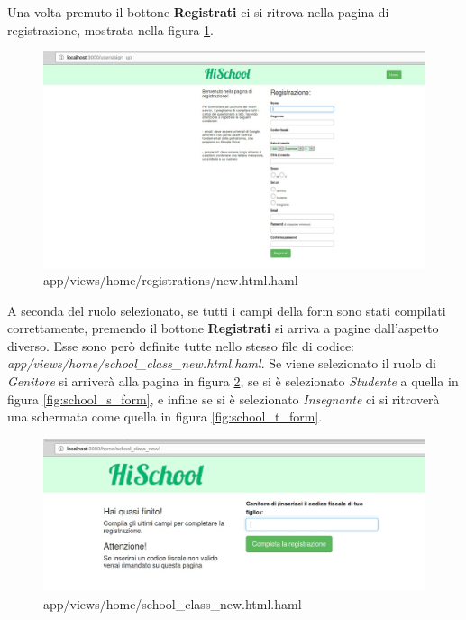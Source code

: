 \documentclass[Lau, binding=0.6cm, oneside]{sapthesis}
\begin{document}
Una volta premuto il bottone \textbf{Registrati} ci si ritrova nella pagina di registrazione, mostrata nella figura \ref{fig:registration_page}.

\begin{figure}[H]
	\centering
	\includegraphics[width=1\linewidth]{images/registration_page} 
	\caption{app/views/home/registrations/new.html.haml}
	\label{fig:registration_page}
\end{figure}

A seconda del ruolo selezionato, se tutti i campi della form sono stati compilati correttamente, premendo il bottone \textbf{Registrati} si arriva a pagine dall'aspetto diverso. Esse sono però definite tutte nello stesso file di codice: \textit{app/views/home/school\_class\_new.html.haml}. 
Se viene selezionato il ruolo di \textit{Genitore} si arriverà alla pagina in figura \ref{fig:school_p_form}, se si è selezionato \textit{Studente}      a quella in figura \ref{fig:school_s_form}, e infine se si è selezionato \textit{Insegnante} ci si ritroverà una schermata come quella in figura \ref{fig:school_t_form}.

\begin{figure}[H]
	\centering
	\includegraphics[width=1\linewidth]{images/school_p_form} 
	\caption{app/views/home/school\_class\_new.html.haml}
	\label{fig:school_p_form}
\end{figure}
\end{document}
